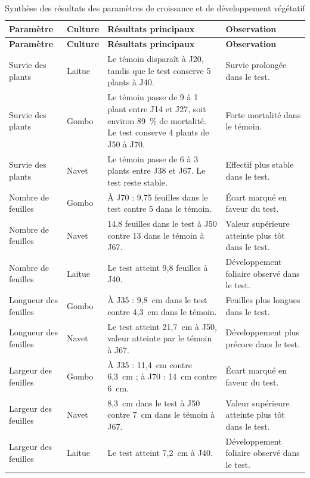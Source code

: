 {\small
\begin{longtable}{|p{2.5cm}|p{1.6cm}|p{6.1cm}|p{3.6cm}|}
    \caption{Synthèse des résultats des paramètres de croissance et de développement végétatif}
    \label{tab:synthese_croissance} \\
    \hline
    \textbf{Paramètre} & \textbf{Culture} & \textbf{Résultats principaux} & \textbf{Observation} \\
    \hline
    \endfirsthead
    \hline
    \textbf{Paramètre} & \textbf{Culture} & \textbf{Résultats principaux} & \textbf{Observation} \\
    \hline
    \endhead
    Survie des plants & Laitue & Le témoin disparaît à J20, tandis que le test conserve 5 plants à J40. & Survie prolongée dans le test. \\
    \hline
    Survie des plants & Gombo & Le témoin passe de 9 à 1 plant entre J14 et J27, soit environ 89~\% de mortalité. Le test conserve 4 plants de J50 à J70. & Forte mortalité dans le témoin. \\
    \hline
    Survie des plants & Navet & Le témoin passe de 6 à 3 plants entre J38 et J67. Le test reste stable. & Effectif plus stable dans le test. \\
    \hline
    Nombre de feuilles & Gombo & À J70 : 9,75 feuilles dans le test contre 5 dans le témoin. & Écart marqué en faveur du test. \\
    \hline
    Nombre de feuilles & Navet & 14,8 feuilles dans le test à J50 contre 13 dans le témoin à J67. & Valeur supérieure atteinte plus tôt dans le test. \\
    \hline
    Nombre de feuilles & Laitue & Le test atteint 9,8 feuilles à J40. & Développement foliaire observé dans le test. \\
    \hline
    Longueur des feuilles & Gombo & À J35 : 9,8~cm dans le test contre 4,3~cm dans le témoin. & Feuilles plus longues dans le test. \\
    \hline
    Longueur des feuilles & Navet & Le test atteint 21,7~cm à J50, valeur atteinte par le témoin à J67. & Développement plus précoce dans le test. \\
    \hline
    Largeur des feuilles & Gombo & À J35 : 11,4~cm contre 6,3~cm ; à J70 : 14~cm contre 6~cm. & Écart marqué en faveur du test. \\
    \hline
    Largeur des feuilles & Navet & 8,3~cm dans le test à J50 contre 7~cm dans le témoin à J67. & Valeur supérieure atteinte plus tôt dans le test. \\
    \hline
    Largeur des feuilles & Laitue & Le test atteint 7,2~cm à J40. & Développement foliaire observé dans le test. \\
    \hline
\end{longtable}
}

